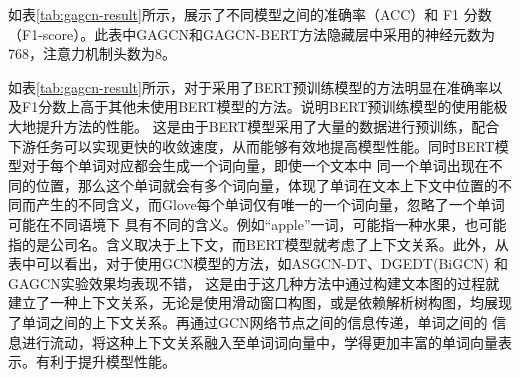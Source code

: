 如表\ref{tab:gagcn-result}所示，展示了不同模型之间的准确率（ACC）和 F1 分数（F1-score）。此表中GAGCN和GAGCN-BERT方法隐藏层中采用的神经元数为768，注意力机制头数为8。

如表\ref{tab:gagcn-result}所示，对于采用了BERT预训练模型的方法明显在准确率以及F1分数上高于其他未使用BERT模型的方法。说明BERT预训练模型的使用能极大地提升方法的性能。
这是由于BERT模型采用了大量的数据进行预训练，配合下游任务可以实现更快的收敛速度，从而能够有效地提高模型性能。同时BERT模型对于每个单词对应都会生成一个词向量，即使一个文本中
同一个单词出现在不同的位置，那么这个单词就会有多个词向量，体现了单词在文本上下文中位置的不同而产生的不同含义，而Glove每个单词仅有唯一的一个词向量，忽略了一个单词可能在不同语境下
具有不同的含义。例如“apple”一词，可能指一种水果，也可能指的是公司名。含义取决于上下文，而BERT模型就考虑了上下文关系。此外，从表中可以看出，对于使用GCN模型的方法，如ASGCN-DT、DGEDT(BiGCN)
和GAGCN实验效果均表现不错，
这是由于这几种方法中通过构建文本图的过程就建立了一种上下文关系，无论是使用滑动窗口构图，或是依赖解析树构图，均展现了单词之间的上下文关系。再通过GCN网络节点之间的信息传递，单词之间的
信息进行流动，将这种上下文关系融入至单词词向量中，学得更加丰富的单词向量表示。有利于提升模型性能。


